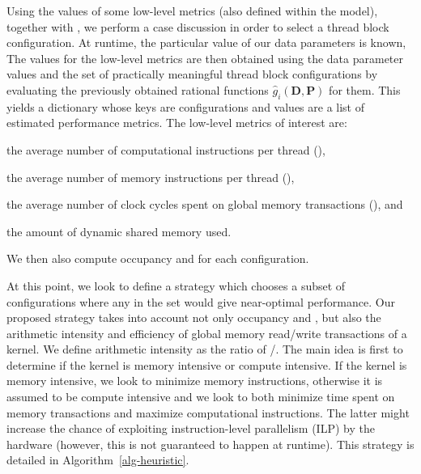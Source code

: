 Using the values of some low-level metrics (also defined within the {\mwpcwp} model),
together with {\ec},
we perform a case discussion in order to select a thread block configuration.
At runtime, the particular value of our data parameters is known,
The values for the low-level metrics are then 
obtained using the data parameter values and the set of practically meaningful 
thread block configurations by evaluating
the previously obtained rational functions $\hat{g}_i(\bm{D}, \bm{P})$ 
for them.
This yields a dictionary whose keys are configurations
and values are a list of estimated performance metrics.
The low-level metrics of interest are:
\begin{inparaenum}[(i)]
\item the average number of computational instructions per thread ({\compinst}), 
\item the average number of memory instructions per thread ({\meminst}),
\item the average number of clock cycles spent on global memory transactions ({\memld}), and
\item the amount of dynamic shared memory used.%
\end{inparaenum}
We then also compute occupancy and {\ec} for each configuration.

\iffalse
Another strategy would be to pick a subset of configurations with the 
highest estimated occupancy. This approach can also lead to poor 
results due to the reasons explained for the previous strategy.
Therefore, we cannot consider this strategy as well.
\fi

At this point, we look to define a strategy which chooses 
a subset of configurations where any in the set 
would give near-optimal performance.
Our proposed strategy takes into account not only occupancy
and {\ec}, but also the arithmetic intensity and efficiency of global memory
read/write transactions of a kernel.
We define arithmetic intensity as the ratio of 
{{\compinst}/{\meminst}}.
The main idea is first to determine if the 
kernel is memory intensive or compute intensive.
{If the kernel is memory intensive, we look to minimize memory instructions, 
otherwise it is assumed to be compute intensive and we look to both minimize
time spent on memory transactions and maximize computational instructions. 
The latter might increase the chance of exploiting 
instruction-level parallelism (ILP) by the hardware 
(however, this is not guaranteed to happen at runtime).}
This strategy is detailed in Algorithm~\ref{alg-heuristic}.

